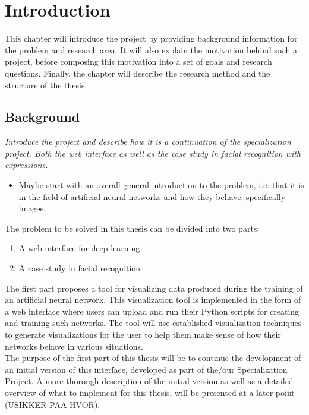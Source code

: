 
\chapter{Introduction}

This chapter will introduce the project by providing background information for the problem and research area. It will also explain the motivation behind such a project, before composing this motivation into a set of goals and research questions. Finally, the chapter will describe the research method and the structure of the thesis.

\section{Background}

\textit{Introduce the project and describe how it is a continuation of the specialization project. Both the web interface as well as the case study in facial recognition with expressions.}

\begin{itemize}
    \item Maybe start with an overall general introduction to the problem, i.e. that it is in the field of artificial neural networks and how they behave, specifically images.
\end{itemize}

\noindent The problem to be solved in this thesis can be divided into two parts:
\begin{enumerate}
    \item A web interface for deep learning
    \item A case study in facial recognition
\end{enumerate}

\noindent The first part proposes a tool for visualizing data produced during the training of an artificial neural network. This visualization tool is implemented in the form of a web interface where users can upload and run their Python scripts for creating and training such networks. The tool will use established visualization techniques to generate visualizations for the user to help them make sense of how their networks behave in various situations. \\

\noindent The purpose of the first part of this thesis will be to continue the development of an initial version of this interface, developed as part of the/our Specialization Project. A more thorough description of the initial version as well as a detailed overview of what to implement for this thesis, will be presented at a later point (USIKKER PAA HVOR). \\

